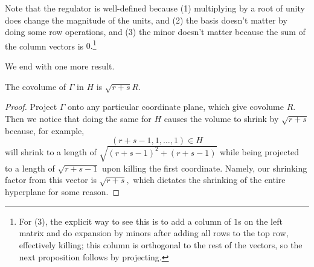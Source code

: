 \documentclass[../notes.tex]{subfiles}
\begin{document}
Note that the regulator is well-defined because (1) multiplying by a root of unity does change the magnitude of the units, and (2) the basis doesn't matter by doing some row operations, and (3) the minor doesn't matter because the sum of the column vectors is $0.$\footnote{For (3), the explicit way to see this is to add a column of $1$s on the left matrix and do expansion by minors after adding all rows to the top row, effectively killing; this column is orthogonal to the rest of the vectors, so the next proposition follows by projecting.}

We end with one more result.
\begin{proposition}
    The covolume of $\Gamma$ in $H$ is $\sqrt{r+s}R.$
\end{proposition}
\begin{proof}
    Project $\Gamma$ onto any particular coordinate plane, which give covolume $R.$ Then we notice that doing the same for $H$ causes the volume to shrink by $\sqrt{r+s}$ because, for example,
    \[(r+s-1,1,\ldots,1)\in H\]
    will shrink to a length of $\sqrt{(r+s-1)^2+(r+s-1)}$ while being projected to a length of $\sqrt{r+s-1}$ upon killing the first coordinate. Namely, our shrinking factor from this vector is $\sqrt{r+s},$ which dictates the shrinking of the entire hyperplane for some reason.\todo{}
\end{proof}
\end{document}
